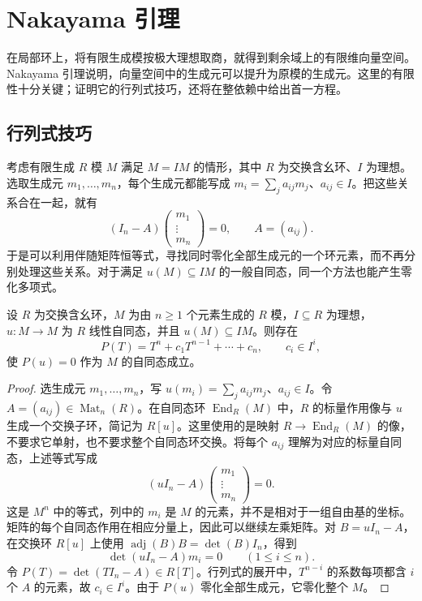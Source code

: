 
\section{Nakayama 引理}
\label{b3:sec:0302}

在局部环上，将有限生成模按极大理想取商，就得到剩余域上的有限维向量空间。Nakayama 引理说明，向量空间中的生成元可以提升为原模的生成元。这里的有限性十分关键；证明它的行列式技巧，还将在整依赖中给出首一方程。

\subsection{行列式技巧}
\label{b3:subsec:0302:01}

考虑有限生成 \(R\) 模 \(M\) 满足 \(M=IM\) 的情形，其中 \(R\) 为交换含幺环、\(I\) 为理想。选取生成元 \(m_1,\ldots,m_n\)，每个生成元都能写成 \(m_i=\sum_j a_{ij}m_j\)、\(a_{ij}\in I\)。把这些关系合在一起，就有
\[
	(I_n-A)\begin{pmatrix}m_1\\ \vdots\\m_n\end{pmatrix}=0,
	\qquad A=(a_{ij}).
\]
于是可以利用伴随矩阵恒等式，寻找同时零化全部生成元的一个环元素，而不再分别处理这些关系。对于满足 \(u(M)\subseteq IM\) 的一般自同态，同一个方法也能产生零化多项式。

\begin{theorem}[行列式技巧]\label{b3:thm:determinant-trick}
	设 \(R\) 为交换含幺环，\(M\) 为由 \(n\ge1\) 个元素生成的 \(R\) 模，\(I\subseteq R\) 为理想， \(u:M\rightarrow M\) 为 \(R\) 线性自同态，并且 \(u(M)\subseteq IM\)。则存在
	\[
		P(T)=T^n+c_1T^{n-1}+\cdots+c_n,\qquad c_i\in I^i,
	\]
	使 \(P(u)=0\) 作为 \(M\) 的自同态成立。
\end{theorem}
\begin{proof}
	选生成元 \(m_1,\ldots,m_n\)，写 \(u(m_i)=\sum_j a_{ij}m_j\)、\(a_{ij}\in I\)。令 \(A=(a_{ij})\in\operatorname{Mat}_n(R)\)。在自同态环 \(\operatorname{End}_R(M)\) 中，\(R\) 的标量作用像与 \(u\) 生成一个交换子环，简记为 \(R[u]\)。这里使用的是映射 \(R\to\operatorname{End}_R(M)\) 的像，不要求它单射，也不要求整个自同态环交换。将每个 \(a_{ij}\) 理解为对应的标量自同态，上述等式写成
	\[
		(uI_n-A)\begin{pmatrix}m_1\\ \vdots\\m_n\end{pmatrix}=0.
	\]
	这是 \(M^n\) 中的等式，列中的 \(m_i\) 是 \(M\) 的元素，并不是相对于一组自由基的坐标。矩阵的每个自同态作用在相应分量上，因此可以继续左乘矩阵。对 \(B=uI_n-A\)，在交换环 \(R[u]\) 上使用 \(\operatorname{adj}(B)B=\det(B)I_n\)，得到
	\[
		\det(uI_n-A)m_i=0\qquad(1\le i\le n).
	\]
	令 \(P(T)=\det(TI_n-A)\in R[T]\)。行列式的展开中，\(T^{n-i}\) 的系数每项都含 \(i\) 个 \(A\) 的元素，故 \(c_i\in I^i\)。由于 \(P(u)\) 零化全部生成元，它零化整个 \(M\)。
\end{proof}

